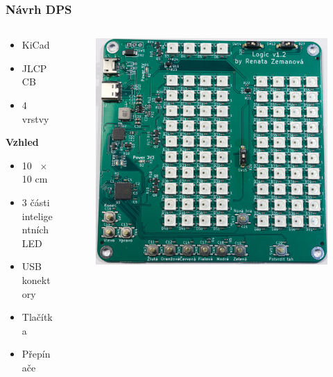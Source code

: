\documentclass[%
  12pt,       				%
	t,                  %
	aspectratio=1610,   %
	unicode,						%
]{beamer}				    	%
\begin{document}
\begin{frame} 
	\frametitle{Návrh DPS}
		\begin{columns}[T] 	
		\begin{column}{0.4\textwidth}		%
			\vspace{0.5cm}
			\begin{itemize}
				\item KiCad
				\item JLCPCB
				\item 4 vrstvy
			\end{itemize}
			\vspace{0.5cm}
			\textbf{Vzhled}
			\begin{itemize}
				\item 10 ~$\times$ 10 cm
				\item 3 části inteligentních LED
				\item USB konektory
				\item Tlačítka
				\item Přepínače
			\end{itemize}
		\end{column}

		\begin{column}{0.6\textwidth}		%
			\begin{figure}%
				\centering
				\includegraphics[width=0.8\columnwidth]{obrazky/Finalni_verze.jpg}
			\end{figure}%
		\end{column}
	\end{columns}
\end{frame}
\end{document}
